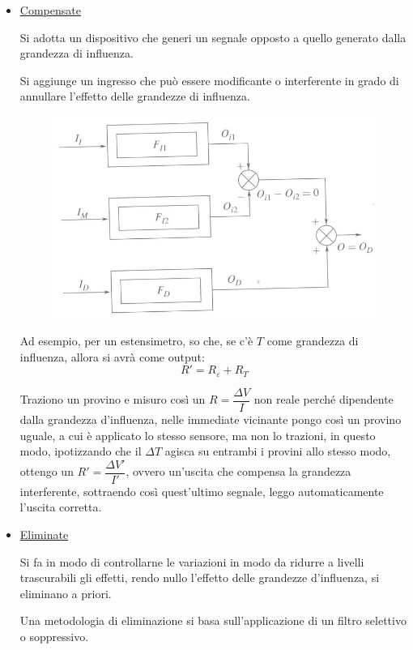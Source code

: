 \documentclass[a4paper, 15pt]{article}
\begin{document}
\begin{adjustwidth}{2in}{}
\begin{itemize}
		\item \underline{Compensate} 
		
		Si adotta un dispositivo che generi un segnale opposto a quello
		generato dalla grandezza di influenza.
		
		Si aggiunge un ingresso che può essere modificante o interferente in grado di
		annullare l’effetto delle grandezze di influenza.
		
\begin{figure}[H]
	\centering
	\includegraphics[width=0.5\linewidth]{fig/screenshot031}
	\label{fig:screenshot031}
\end{figure}

		Ad esempio, per un estensimetro, so che, se c'è $T$ come grandezza di influenza, allora si avrà come output:
		\[ R' = R_\varepsilon + R_T\]
		
		Traziono un provino e misuro così un $R = \dfrac{\Delta V}{I}$ non reale perché dipendente dalla grandezza d'influenza, nelle immediate vicinante pongo così un provino uguale, a cui è applicato lo stesso sensore, ma non lo trazioni, in questo modo, ipotizzando che il $\Delta T$ agisca su entrambi i provini allo stesso modo, ottengo un $R' = \dfrac{\Delta V'}{I'}$, ovvero un'uscita che compensa la grandezza interferente, sottraendo così quest'ultimo segnale, leggo automaticamente l'uscita corretta. 
		
		\item \underline{Eliminate} 
		
		Si fa in modo di controllarne le variazioni in modo da ridurre a livelli
		trascurabili gli effetti, rendo nullo l'effetto delle grandezze d'influenza, si eliminano a priori.
		
		Una metodologia di eliminazione si basa sull’applicazione di un filtro selettivo
		o soppressivo. \newline
		

\end{itemize}
\end{adjustwidth}
\end{document}
